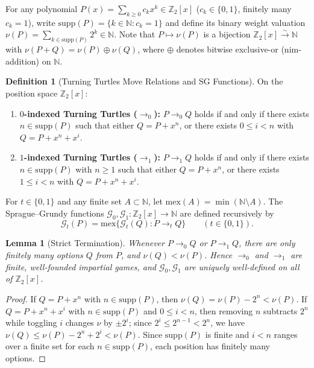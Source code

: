 \documentclass[11pt,a4paper]{article}
\newtheorem{lemma}[theorem]{Lemma}
\theoremstyle{definition}
\newtheorem{definition}[theorem]{Definition}
\newcommand{\Z}{\mathbb{Z}}
\newcommand{\N}{\mathbb{N}}
\newcommand{\SG}{\mathcal{G}}
\newcommand{\mex}{\mathrm{mex}}
\newcommand{\supp}{\mathrm{supp}}
\begin{document}
For any polynomial $P(x) = \sum_{k\ge 0} c_k x^k \in \Z_2[x]$ ($c_k \in \{0,1\}$, finitely
many $c_k = 1$), write $\supp(P) = \{k \in \N : c_k = 1\}$ and define its binary weight
valuation $\nu(P) = \sum_{k\in\supp(P)} 2^k \in \N$. Note that $P \mapsto \nu(P)$ is a
bijection $\Z_2[x] \xrightarrow{\sim} \N$ with $\nu(P + Q) = \nu(P) \oplus \nu(Q)$, where
$\oplus$ denotes bitwise exclusive-or (nim-addition) on $\N$.

\begin{definition}[Turning Turtles Move Relations and SG Functions]
\label{def:tt}
On the position space $\Z_2[x]$:
\begin{enumerate}
  \setlength{\itemsep}{2pt}
  \item \textbf{$0$-indexed Turning Turtles ($\to_0$):} $P \to_0 Q$ holds if and only if
    there exists $n \in \supp(P)$ such that either $Q = P + x^n$, or there exists
    $0 \le i < n$ with $Q = P + x^n + x^i$.
  \item \textbf{$1$-indexed Turning Turtles ($\to_1$):} $P \to_1 Q$ holds if and only if
    there exists $n \in \supp(P)$ with $n \ge 1$ such that either $Q = P + x^n$, or there
    exists $1 \le i < n$ with $Q = P + x^n + x^i$.
\end{enumerate}
For $t \in \{0,1\}$ and any finite set $A \subset \N$, let
$\mex(A) = \min(\N \setminus A)$. The Sprague--Grundy functions $\SG_0, \SG_1 : \Z_2[x] \to \N$
are defined recursively by
\[
  \SG_t(P) = \mex\{\SG_t(Q) : P \to_t Q\} \qquad (t \in \{0,1\}).
\]
\end{definition}

\begin{lemma}[Strict Termination]
\label{lem:wf}
Whenever $P \to_0 Q$ or $P \to_1 Q$, there are only finitely many options $Q$ from $P$,
and $\nu(Q) < \nu(P)$. Hence $\to_0$ and $\to_1$ are finite, well-founded impartial games,
and $\SG_0, \SG_1$ are uniquely well-defined on all of $\Z_2[x]$.
\end{lemma}

\begin{proof}
If $Q = P + x^n$ with $n \in \supp(P)$, then $\nu(Q) = \nu(P) - 2^n < \nu(P)$. If
$Q = P + x^n + x^i$ with $n \in \supp(P)$ and $0 \le i < n$, then removing $n$ subtracts
$2^n$ while toggling $i$ changes $\nu$ by $\pm 2^i$; since $2^i \le 2^{n-1} < 2^n$, we have
$\nu(Q) \le \nu(P) - 2^n + 2^i < \nu(P)$. Since $\supp(P)$ is finite and $i < n$ ranges
over a finite set for each $n \in \supp(P)$, each position has finitely many options.
\end{proof}
\end{document}
